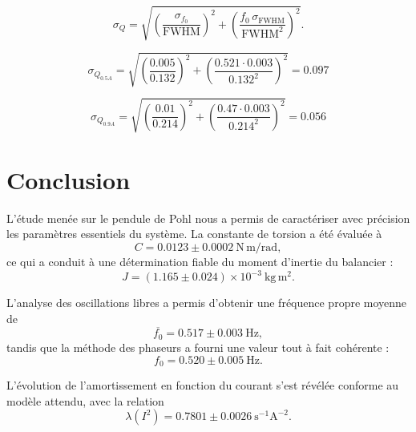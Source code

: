 \[
\sigma_Q
=
\sqrt{
\left(\frac{\sigma_{f_0}}{\mathrm{FWHM}}\right)^2
+
\left(
\frac{f_0\,\sigma_{\mathrm{FWHM}}}{\mathrm{FWHM}^2}
\right)^2
}.
\]

\[
\sigma_{Q_{0.5A}}
=
\sqrt{
\left(\frac{0.005}{0.132}\right)^2
+
\left(\frac{0.521 \cdot 0.003}{0.132^2}\right)^2
}
= 0.097
\]

\[
\sigma_{Q_{0.9A}}
=
\sqrt{
\left(\frac{0.01}{0.214}\right)^2
+
\left(\frac{0.47 \cdot 0.003}{0.214^2}\right)^2
}
= 0.056
\]


\section{Conclusion}


L’étude menée sur le pendule de Pohl nous a permis de caractériser avec précision les paramètres essentiels du système. 
La constante de torsion a été évaluée à 
\[
C = 0.0123 \pm 0.0002~\mathrm{N\,m/rad},
\]
ce qui a conduit à une détermination fiable du moment d’inertie du balancier :
\[
J = (1.165 \pm 0.024)\times 10^{-3}~\mathrm{kg\,m^2}.
\]

L’analyse des oscillations libres a permis d’obtenir une fréquence propre moyenne de
\[
\overline{f_0} = 0.517 \pm 0.003~\mathrm{Hz},
\]
tandis que la méthode des phaseurs a fourni une valeur tout à fait cohérente :
\[
f_0 = 0.520 \pm 0.005~\mathrm{Hz}.
\]

L’évolution de l’amortissement en fonction du courant s’est révélée conforme au modèle attendu, avec la relation
\[
\lambda(I^2) = 0.7801 \pm 0.0026~\mathrm{s^{-1}A^{-2}}.
\]

